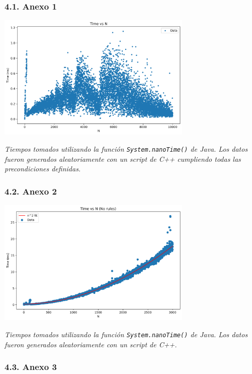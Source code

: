 \documentclass[
]{article}
\begin{document}
\hypertarget{anexo-1}{%
\subsubsection{4.1. Anexo 1}\label{anexo-1}}

\begin{center}
\includegraphics[width=0.7\textwidth]{chart_rules.png}
\end{center}

\emph{Tiempos tomados
utilizando la función \texttt{System.nanoTime()} de Java. Los datos
fueron generados aleatoriamente con un script de C++ cumpliendo todas
las precondiciones definidas.}

\hypertarget{anexo-2}{%
\subsubsection{4.2. Anexo 2}\label{anexo-2}}

\begin{center}
\includegraphics[width=0.7\textwidth]{chart_no_rules.png}
\end{center}

\emph{Tiempos tomados
utilizando la función \texttt{System.nanoTime()} de Java. Los datos
fueron generados aleatoriamente con un script de C++.}

\hypertarget{anexo-3}{%
\subsubsection{4.3. Anexo 3}\label{anexo-3}}
\end{document}
